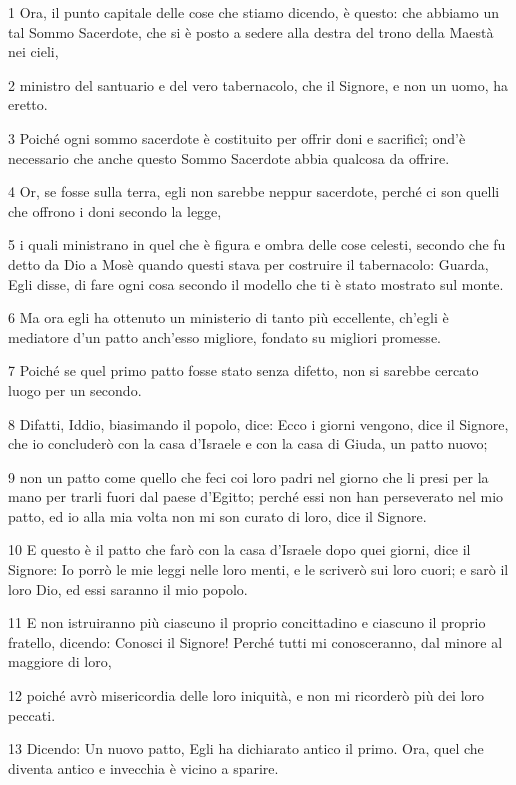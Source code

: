 \par 1 Ora, il punto capitale delle cose che stiamo dicendo, è questo: che abbiamo un tal Sommo Sacerdote, che si è posto a sedere alla destra del trono della Maestà nei cieli,
\par 2 ministro del santuario e del vero tabernacolo, che il Signore, e non un uomo, ha eretto.
\par 3 Poiché ogni sommo sacerdote è costituito per offrir doni e sacrificî; ond'è necessario che anche questo Sommo Sacerdote abbia qualcosa da offrire.
\par 4 Or, se fosse sulla terra, egli non sarebbe neppur sacerdote, perché ci son quelli che offrono i doni secondo la legge,
\par 5 i quali ministrano in quel che è figura e ombra delle cose celesti, secondo che fu detto da Dio a Mosè quando questi stava per costruire il tabernacolo: Guarda, Egli disse, di fare ogni cosa secondo il modello che ti è stato mostrato sul monte.
\par 6 Ma ora egli ha ottenuto un ministerio di tanto più eccellente, ch'egli è mediatore d'un patto anch'esso migliore, fondato su migliori promesse.
\par 7 Poiché se quel primo patto fosse stato senza difetto, non si sarebbe cercato luogo per un secondo.
\par 8 Difatti, Iddio, biasimando il popolo, dice: Ecco i giorni vengono, dice il Signore, che io concluderò con la casa d'Israele e con la casa di Giuda, un patto nuovo;
\par 9 non un patto come quello che feci coi loro padri nel giorno che li presi per la mano per trarli fuori dal paese d'Egitto; perché essi non han perseverato nel mio patto, ed io alla mia volta non mi son curato di loro, dice il Signore.
\par 10 E questo è il patto che farò con la casa d'Israele dopo quei giorni, dice il Signore: Io porrò le mie leggi nelle loro menti, e le scriverò sui loro cuori; e sarò il loro Dio, ed essi saranno il mio popolo.
\par 11 E non istruiranno più ciascuno il proprio concittadino e ciascuno il proprio fratello, dicendo: Conosci il Signore! Perché tutti mi conosceranno, dal minore al maggiore di loro,
\par 12 poiché avrò misericordia delle loro iniquità, e non mi ricorderò più dei loro peccati.
\par 13 Dicendo: Un nuovo patto, Egli ha dichiarato antico il primo. Ora, quel che diventa antico e invecchia è vicino a sparire.

